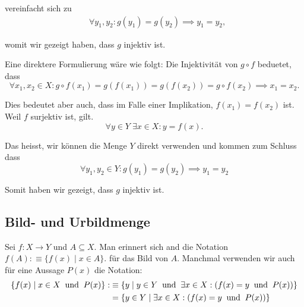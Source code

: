 \begin{imp-ex}
\begin{enumerate}
{      vereinfacht sich zu
      \begin{equation}
        \begin{aligned}
          &\forall y_1,y_2: g(y_1) = g(y_2) \implies y_1=y_2,
        \end{aligned}
      \end{equation}

      womit wir gezeigt haben, dass $g$ injektiv ist.

      Eine direktere Formulierung wäre wie folgt: Die Injektivität von $g \circ f$ beduetet, dass
      \begin{equation}
        \forall x_1, x_2 \in X:
        g \circ f (x_1) = g (f(x_1)) = g(f(x_2)) = g \circ f(x_2) \implies x_1 = x_2.
      \end{equation}

      Dies bedeutet aber auch, dass im Falle einer Implikation, $f(x_1) = f(x_2)$ ist. Weil $f$ surjektiv ist, gilt. \begin{equation}
        \forall y \in Y \; \exists x \in X: y = f(x).
      \end{equation}

      Das heisst, wir können die Menge $Y$ direkt verwenden und kommen zum Schluss dass
      \begin{equation}
        \forall y_1, y_2 \in Y: g(y_1) = g(y_2) \implies y_1 = y_2
      \end{equation}

      Somit haben wir gezeigt, dass $g$ injektiv ist.
    }
  \end{enumerate}
\end{imp-ex}

\subsection{Bild- und Urbildmenge}
Sei $f: X \to Y$ und $A \subseteq X$. Man erinnert sich and die Notation $f(A) :\equiv \{f(x) \mid x \in A\}.$ für das Bild von $A$. Manchmal verwenden wir auch für eine Aussage $P(x)$ die Notation:
\begin{equation}
  \label{eq: vereinfachte schreibweise}
  \begin{aligned}
    \{ f(x) \mid x \in X \;\; \text{und}\;\; P(x) \}
    : &\equiv
    \left \{ y \mid y \in Y \;\; \text{und}\;\; \exists x \in X : \left(f(x) = y \;\; \text{und}\;\; P(x) \right) \right \} \\
    &=   \left \{ y \in Y \mid  \exists x \in X : \left(f(x) = y \;\; \text{und}\;\; P(x) \right) \right \}
  \end{aligned}
\end{equation}

